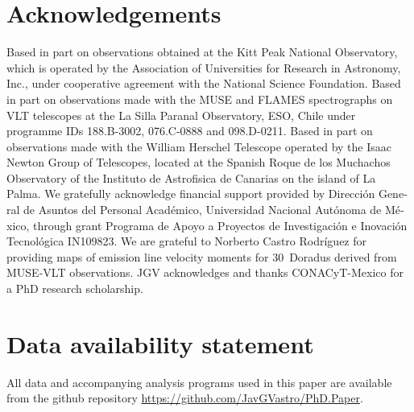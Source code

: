 \documentclass[fleqn,usenatbib, useAMS, a4paper]{mnras}
\begin{document}




\section*{Acknowledgements}

Based in part on observations obtained at the Kitt Peak National Observatory,
which is operated by the Association of Universities for Research in Astronomy, Inc.,
under cooperative agreement with the National Science Foundation.
Based in part on observations made with the MUSE and FLAMES spectrographs
on VLT telescopes at the La Silla Paranal Observatory, ESO, Chile
under programme IDs 188.B-3002, 076.C-0888 and 098.D-0211.
Based in part on observations made with the William Herschel Telescope
operated by the Isaac Newton Group of Telescopes,
located at the Spanish
\foreignlanguage{spanish}{Roque de los Muchachos}
Observatory of the
\foreignlanguage{spanish}{Instituto de Astrofisica de Canarias}
on the island of La Palma. 
We gratefully acknowledge financial support provided by
\foreignlanguage{spanish}{%
  Dirección General de Asuntos del Personal Académico,
  Universidad Nacional Autónoma de México},
through grant
\foreignlanguage{spanish}{%
  Programa de Apoyo a Proyectos de Investigación
  e Inovación Tecnológica}
IN109823.  
We are grateful to Norberto Castro Rodríguez for providing maps of emission line velocity moments
for 30~Doradus derived from MUSE-VLT observations.
JGV acknowledges and thanks CONACyT-Mexico for a PhD research scholarship.


\section*{Data availability statement}
\label{sec:data-avail-stat}
All data and accompanying analysis programs used in this paper are available
from the github repository \url{https://github.com/JavGVastro/PhD.Paper}.
\end{document}
